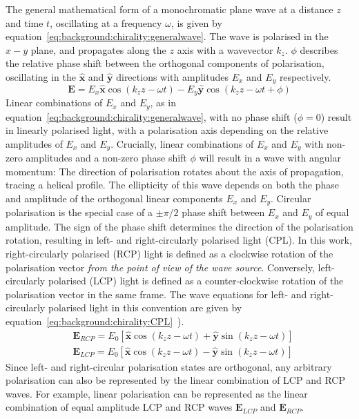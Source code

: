 The general mathematical form of a monochromatic plane wave at a distance $z$ and time $t$, oscillating at a frequency $\omega$, is given by equation~\ref{eq:background:chirality:generalwave}. The wave is polarised in the $x-y$ plane, and propagates along the $z$ axis with a wavevector $k_z$. $\phi$ describes the relative phase shift between the orthogonal components of polarisation, oscillating in the $\mathbf{\hat{x}}$ and $\mathbf{\hat{y}}$ directions with amplitudes $E_x$ and $E_y$ respectively.
\begin{equation} \label{eq:background:chirality:generalwave}
    \mathbf{E}= E_x  \mathbf{\hat{x}} \cos(k_z z-\omega t) - E_y \mathbf{\hat{y}} \cos(k_z z-\omega t +\phi)
\end{equation}
Linear combinations of $E_x$ and $E_y$, as in equation~\ref{eq:background:chirality:generalwave}, with no phase shift ($\phi=0$) result in linearly polarised light, with a polarisation axis depending on the relative amplitudes of $E_x$ and $E_y$. Crucially, linear combinations of $E_x$ and $E_y$ with non-zero amplitudes and a non-zero phase shift $\phi$ will result in a wave with angular momentum: The direction of polarisation rotates about the axis of propagation, tracing a helical profile. The ellipticity of this wave depends on both the phase and amplitude of the orthogonal linear components $E_x$ and $E_y$. Circular polarisation is the special case of a $\pm \pi/2$ phase shift between $E_x$ and $E_y$ of equal amplitude. The sign of the phase shift determines the direction of the polarisation rotation, resulting in left- and right-circularly polarised light (CPL). In this work, right-circularly polarised (RCP) light is defined as a clockwise rotation of the polarisation vector \textit{from the point of view of the wave source}. Conversely, left-circularly polarised (LCP) light is defined as a counter-clockwise rotation of the polarisation vector in the same frame. The wave equations for left- and right-circularly polarised light in this convention are given by equation~\ref{eq:background:chirality:CPL}~\cite[\S 8.1.2]{Hecht2013}). 
\begin{equation} \label{eq:background:chirality:CPL}
    \begin{split}
        & \mathbf{E}_{RCP} = E_0 \left[ \mathbf{\hat{x}} \cos(k_z z-\omega t) + \mathbf{\hat{y}} \sin(k_z z-\omega t )\right]\\
        & \mathbf{E}_{LCP}= E_0 \left[ \mathbf{\hat{x}} \cos(k_z z-\omega t) - \mathbf{\hat{y}} \sin(k_z z-\omega t )\right]
    \end{split}
\end{equation}
Since left- and right-circular polarisation states are orthogonal, any arbitrary polarisation can also be represented by the linear combination of LCP and RCP waves. For example, linear polarisation can be represented as the linear combination of equal amplitude LCP and RCP waves $\mathbf{E}_{LCP}$ and $\mathbf{E}_{RCP}$. 

